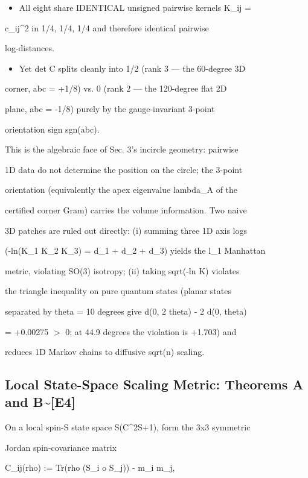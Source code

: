 \documentclass[11pt,a4paper]{article}
\theoremstyle{definition}
\begin{document}
\begin{itemize}[leftmargin=1.4em]
\item All eight share IDENTICAL unsigned pairwise kernels K\_ij =
\end{itemize}
    c\_ij\^{}2 in {1/4, 1/4, 1/4} and therefore identical pairwise

    log-distances.

\begin{itemize}[leftmargin=1.4em]
\item Yet det C splits cleanly into 1/2 (rank 3 — the 60-degree 3D
\end{itemize}
    corner, abc = +1/8) vs. 0 (rank 2 — the 120-degree flat 2D

    plane, abc = -1/8) purely by the gauge-invariant 3-point

    orientation sign sgn(abc).


This is the algebraic face of Sec. 3's incircle geometry: pairwise

1D data do not determine the position on the circle; the 3-point

orientation (equivalently the apex eigenvalue lambda\_A of the

certified corner Gram) carries the volume information. Two naive

3D patches are ruled out directly: (i) summing three 1D axis logs

(-ln(K\_1 K\_2 K\_3) = d\_1 + d\_2 + d\_3) yields the l\_1 Manhattan

metric, violating SO(3) isotropy; (ii) taking sqrt(-ln K) violates

the triangle inequality on pure quantum states (planar states

separated by theta = 10 degrees give d(0, 2 theta) - 2 d(0, theta)

= +0.00275 $>$ 0; at 44.9 degrees the violation is +1.703) and

reduces 1D Markov chains to diffusive sqrt(n) scaling.


\subsection{Local State-Space Scaling Metric: Theorems A and B\textasciitilde{}[\textsc{E4}]}

On a local spin-S state space S(C\^{}{2S+1}), form the 3x3 symmetric

Jordan spin-covariance matrix


    C\_ij(rho) := Tr(rho (S\_i o S\_j)) - m\_i m\_j,
\end{document}

